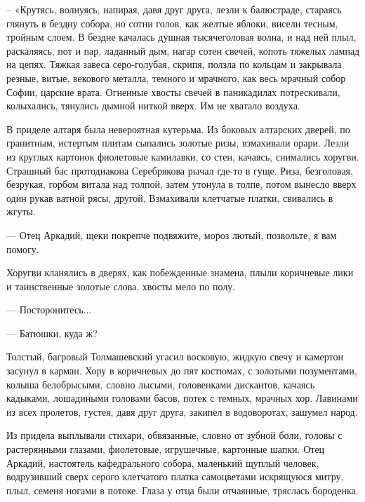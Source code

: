  
 
 
 
 


– «Крутясь, волнуясь, напирая, давя друг друга, лезли к балюстраде, стараясь
глянуть в бездну собора, но сотни голов, как желтые яблоки, висели тесным,
тройным слоем. В бездне качалась душная тысячеголовая волна, и над ней плыл,
раскаляясь, пот и пар, ладанный дым, нагар сотен свечей, копоть тяжелых лампад
на цепях. Тяжкая завеса серо-голубая, скрипя, ползла по кольцам и закрывала
резные, витые, векового металла, темного и мрачного, как весь мрачный собор
Софии, царские врата. Огненные хвосты свечей в паникадилах потрескивали,
колыхались, тянулись дымной ниткой вверх. Им не хватало воздуха.

В приделе алтаря была невероятная кутерьма. Из боковых алтарских дверей, по
гранитным, истертым плитам сыпались золотые ризы, взмахивали орари. Лезли из
круглых картонок фиолетовые камилавки, со стен, качаясь, снимались хоругви.
Страшный бас протодиакона Серебрякова рычал где-то в гуще. Риза, безголовая,
безрукая, горбом витала над толпой, затем утонула в толпе, потом вынесло вверх
один рукав ватной рясы, другой. Взмахивали клетчатые платки, свивались в жгуты.

— Отец Аркадий, щеки покрепче подвяжите, мороз лютый, позвольте, я вам помогу.

Хоругви кланялись в дверях, как побежденные знамена, плыли коричневые лики и
таинственные золотые слова, хвосты мело по полу.

— Посторонитесь...

— Батюшки, куда ж?

Толстый, багровый Толмашевский угасил восковую, жидкую свечу и камертон засунул
в карман. Хору в коричневых до пят костюмах, с золотыми позументами, колыша
белобрысыми, словно лысыми, головенками дискантов, качаясь кадыками, лошадиными
головами басов, потек с темных, мрачных хор. Лавинами из всех пролетов, густея,
давя друг друга, закипел в водоворотах, зашумел народ.

Из придела выплывали стихари, обвязанные, словно от зубной боли, головы с
растерянными глазами, фиолетовые, игрушечные, картонные шапки. Отец Аркадий,
настоятель кафедрального собора, маленький щуплый человек, водрузивший сверх
серого клетчатого платка самоцветами искрящуюся митру, плыл, семеня ногами в
потоке. Глаза у отца были отчаянные, тряслась бороденка.

